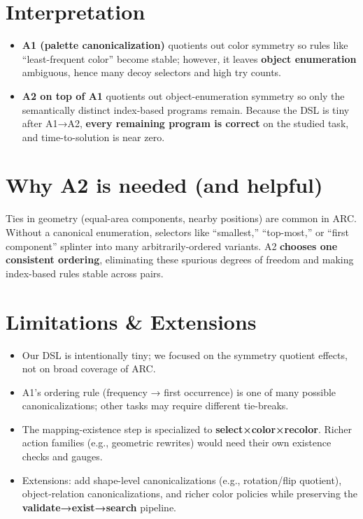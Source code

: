 \documentclass[11pt]{article}
\begin{document}
\section{Interpretation}

\begin{itemize}
\item \textbf{A1 (palette canonicalization)} quotients out color symmetry so rules like ``least-frequent color'' become stable; however, it leaves \textbf{object enumeration} ambiguous, hence many decoy selectors and high try counts.
\item \textbf{A2 on top of A1} quotients out object-enumeration symmetry so only the semantically distinct index-based programs remain. Because the DSL is tiny after A1→A2, \textbf{every remaining program is correct} on the studied task, and time-to-solution is near zero.
\end{itemize}

\section{Why A2 is needed (and helpful)}

Ties in geometry (equal-area components, nearby positions) are common in ARC. Without a canonical enumeration, selectors like ``smallest,'' ``top-most,'' or ``first component'' splinter into many arbitrarily-ordered variants. A2 \textbf{chooses one consistent ordering}, eliminating these spurious degrees of freedom and making index-based rules stable across pairs.

\section{Limitations \& Extensions}

\begin{itemize}
\item Our DSL is intentionally tiny; we focused on the symmetry quotient effects, not on broad coverage of ARC.
\item A1's ordering rule (frequency → first occurrence) is one of many possible canonicalizations; other tasks may require different tie-breaks.
\item The mapping-existence step is specialized to \textbf{select×color×recolor}. Richer action families (e.g., geometric rewrites) would need their own existence checks and gauges.
\item Extensions: add shape-level canonicalizations (e.g., rotation/flip quotient), object-relation canonicalizations, and richer color policies while preserving the \textbf{validate→exist→search} pipeline.
\end{itemize}
\end{document}
